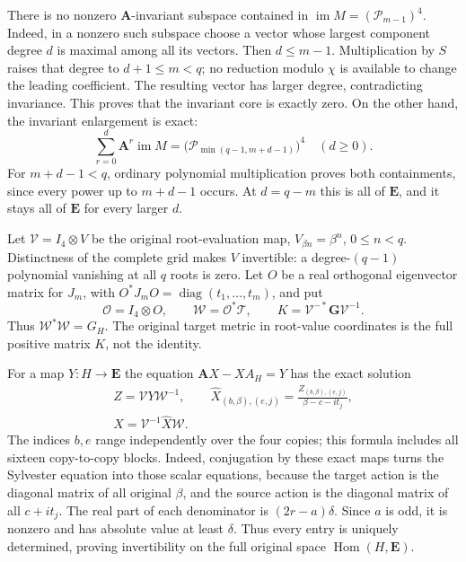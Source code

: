 \documentclass[11pt,a4paper]{article}
\begin{document}
There is no nonzero \(\mathbf A\)-invariant subspace contained in
\(\operatorname{im}M=(\mathcal P_{m-1})^4\).
Indeed, in a nonzero such subspace choose a vector whose largest
component degree \(d\) is maximal among all its vectors.
Then \(d\leq m-1\).
Multiplication by \(S\) raises that degree to \(d+1\leq m<q\);
no reduction modulo \(\chi\) is available to change the leading
coefficient.
The resulting vector has larger degree, contradicting invariance.
This proves that the invariant core is exactly zero.
On the other hand, the invariant enlargement is exact:
\begin{equation}
 \sum_{r=0}^{d}\mathbf A^r\operatorname{im}M
   =\bigl(\mathcal P_{\min(q-1,m+d-1)}\bigr)^4
 \quad(d\geq0).
 \tag{CJA25}
\end{equation}
For \(m+d-1<q\), ordinary polynomial multiplication proves both
containments, since every power up to \(m+d-1\) occurs.
At \(d=q-m\) this is all of \(\mathbf E\), and it stays all of
\(\mathbf E\) for every larger \(d\).

Let \(\mathcal V=I_4\otimes V\) be the original root-evaluation
map, \(V_{\beta n}=\beta^n\), \(0\leq n<q\).
Distinctness of the complete grid makes \(V\) invertible: a
degree-\((q-1)\) polynomial vanishing at all \(q\) roots is zero.
Let \(O\) be a real orthogonal eigenvector matrix for \(J_m\),
with \(O^*J_mO=\operatorname{diag}(t_1,\ldots,t_m)\), and put
\[
 \mathcal O=I_4\otimes O,\qquad
 \mathcal W=\mathcal O^*\mathcal T,\qquad
 K=\mathcal V^{-*}\mathbf G\mathcal V^{-1}.
 \]
Thus \(\mathcal W^*\mathcal W=G_H\).
The original target metric in root-value coordinates is the full
positive matrix \(K\), not the identity.

For a map \(Y:H\to\mathbf E\) the equation
\(\mathbf AX-XA_H=Y\) has the exact solution
\begin{equation}
 \begin{gathered}
 Z=\mathcal VY\mathcal W^{-1},\qquad
 \widehat X_{(b,\beta),(e,j)}
   =\frac{Z_{(b,\beta),(e,j)}}{\beta-c-it_j},\\
 X=\mathcal V^{-1}\widehat X\mathcal W .
 \end{gathered}
 \tag{CJA26}
\end{equation}
The indices \(b,e\) range independently over the four copies;
this formula includes all sixteen copy-to-copy blocks.
Indeed, conjugation by these exact maps turns the Sylvester equation
into those scalar equations, because the target action is the
diagonal matrix of all original \(\beta\), and the source action is
the diagonal matrix of all \(c+it_j\).
The real part of each denominator is \((2r-a)\delta\).
Since \(a\) is odd, it is nonzero and has absolute value at least
\(\delta\).
Thus every entry is uniquely determined, proving invertibility on
the full original space \(\operatorname{Hom}(H,\mathbf E)\).
\end{document}

